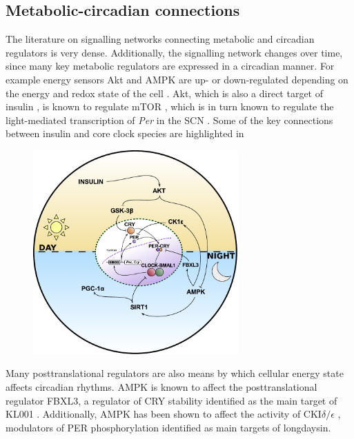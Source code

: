 \subsection{Metabolic-circadian connections}
The literature on signalling networks connecting metabolic and circadian regulators is very dense.
Additionally, the signalling network changes over time, since many key metabolic regulators are expressed in a circadian manner.
For example energy sensors Akt and AMPK are up- or down-regulated depending on the energy and redox state of the cell \cite{Naimi2010}.
Akt, which is also a direct target of insulin \cite{Luni2011}, is known to regulate mTOR \cite{Hahn-Windgassen2005}, which is in turn known to regulate the light-mediated transcription of {\itshape Per} in the SCN \cite{Cao2010}.
Some of the key connections between insulin and core clock species are highlighted in 

\begin{figure}[tbp]
  \centering
  \includegraphics[width=0.7\textwidth]{chap7/figures/metabolic_connections.pdf}
  \label{fig:connections}
\end{figure}

Many posttranslational regulators are also means by which cellular energy state affects circadian rhythms.
AMPK is known to affect the posttranslational regulator FBXL3, a regulator of CRY stability identified as the main target of KL001 \cite{Lamia2009}.
Additionally, AMPK has been shown to affect the activity of CKI$\delta/\epsilon$ \cite{Lee2013}, modulators of PER phosphorylation identified as main targets of longdaysin.

